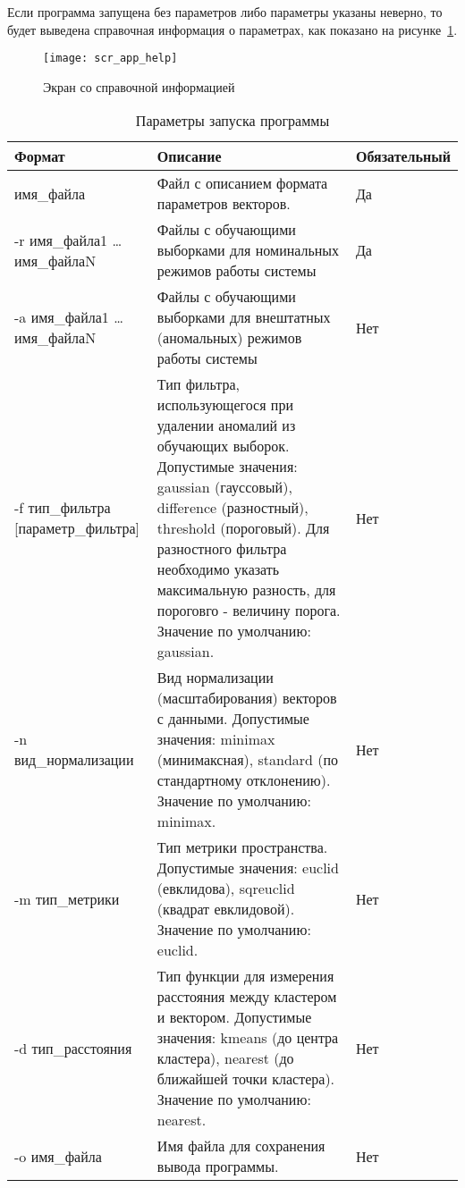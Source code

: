 Если программа запущена без параметров либо параметры указаны неверно, то будет выведена справочная информация о параметрах, как показано на рисунке~\ref{fig:spec:scr:AppHelp}.

\begin{figure}[h]
\texttt{[image: scr\_app\_help]}
\caption{Экран со справочной информацией}
\label{fig:spec:scr:AppHelp}
\end{figure}

\begin{table}[h]
\caption{Параметры запуска программы}
\label{tab:spec:AppOptions}

\begin{tabular}{|C{125pt}|C{255pt}|C{95pt}|}
\hline
Формат & Описание & Обязательный \\
\hline
имя\_файла & Файл с описанием формата параметров векторов. & Да \\
\hline
-r имя\_файла1 \dots имя\_файлаN & Файлы с обучающими выборками для номинальных режимов работы системы & Да \\
\hline
-a имя\_файла1 \dots имя\_файлаN & Файлы с обучающими выборками для внештатных (аномальных) режимов работы системы & Нет \\
\hline
-f тип\_фильтра [параметр\_фильтра] & Тип фильтра, использующегося при удалении аномалий из обучающих выборок. Допустимые значения: gaussian (гауссовый), difference (разностный), threshold (пороговый). Для разностного фильтра необходимо указать максимальную разность, для пороговго - величину порога. Значение по умолчанию: gaussian. & Нет \\
\hline
-n вид\_нормализации & Вид нормализации (масштабирования) векторов с данными. Допустимые значения: minimax (минимаксная), standard (по стандартному отклонению). Значение по умолчанию: minimax. & Нет \\
\hline
-m тип\_метрики & Тип метрики пространства. Допустимые значения: euclid (евклидова), sqreuclid (квадрат евклидовой). Значение по умолчанию: euclid. & Нет \\
\hline
-d тип\_расстояния & Тип функции для измерения расстояния между кластером и вектором. Допустимые значения: kmeans (до центра кластера), nearest (до ближайшей точки кластера). Значение по умолчанию: nearest. & Нет \\
\hline
-o имя\_файла & Имя файла для сохранения вывода программы. & Нет \\
\hline
\end{tabular}
\end{table}

